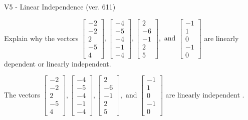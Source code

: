 \begin{exercise}
  \begin{exerciseTitle}V5 - Linear Independence (ver. 611)\end{exerciseTitle}
  \begin{exerciseStatement}
    Explain why the vectors \(\left[\begin{array}{r}
-2 \\
-2 \\
2 \\
-5 \\
4
\end{array}\right] , \left[\begin{array}{r}
-4 \\
-5 \\
-4 \\
-1 \\
-4
\end{array}\right] , \left[\begin{array}{r}
2 \\
-6 \\
-1 \\
2 \\
5
\end{array}\right] , \text{ and } \left[\begin{array}{r}
-1 \\
1 \\
0 \\
-1 \\
0
\end{array}\right]\) are linearly dependent or linearly independent.	


  \end{exerciseStatement}
  \begin{exerciseAnswer}
   The vectors \(\left[\begin{array}{r}
-2 \\
-2 \\
2 \\
-5 \\
4
\end{array}\right] , \left[\begin{array}{r}
-4 \\
-5 \\
-4 \\
-1 \\
-4
\end{array}\right] , \left[\begin{array}{r}
2 \\
-6 \\
-1 \\
2 \\
5
\end{array}\right] , \text{ and } \left[\begin{array}{r}
-1 \\
1 \\
0 \\
-1 \\
0
\end{array}\right]\) are 
  	 linearly independent  .
  


  \end{exerciseAnswer}
\end{exercise}
